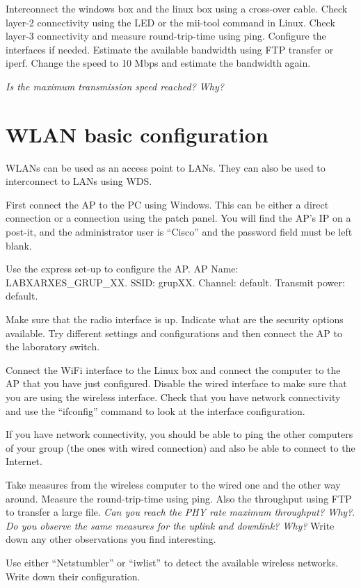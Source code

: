 Interconnect the windows box and the linux box using a cross-over cable.
Check layer-2 connectivity using the LED or the mii-tool command in Linux.
Check layer-3 connectivity and measure round-trip-time using ping. 
Configure the interfaces if needed.
Estimate the available bandwidth using FTP transfer or iperf.
Change the speed to 10 Mbps and estimate the bandwidth again.


\emph{Is the maximum transmission speed reached? Why?}

\section{WLAN basic configuration}

WLANs can be used as an access point to LANs.
They can also be used to interconnect to LANs using WDS.

First connect the AP to the PC using Windows.
This can be either a direct connection or a connection using the patch panel.
You will find the AP's IP on a post-it, and the administrator user is ``Cisco'' and the password field must be left blank.

Use the express set-up to configure the AP.
AP Name: LABXARXES\_GRUP\_XX.
SSID: grupXX.
Channel: default.
Transmit power: default.

Make sure that the radio interface is up. 
Indicate what are the security options available.
Try different settings and configurations and then connect the AP to the laboratory switch.

Connect the WiFi interface to the Linux box and connect the computer to the AP that you have just configured.
Disable the wired interface to make sure that you are using the wireless interface.
Check that you have network connectivity and use the ``ifconfig'' command to look at the interface configuration.

If you have network connectivity, you should be able to ping the other computers of your group (the ones with wired connection) and also be able to connect to the Internet.

Take measures from the wireless computer to the wired one and the other way around.
Measure the round-trip-time using ping.
Also the throughput using FTP to transfer a large file.
\emph{Can you reach the PHY rate maximum throughput? Why?}.
\emph{Do you observe the same measures for the uplink and downlink? Why?}
Write down any other observations you find interesting.

Use either ``Netstumbler'' or ``iwlist'' to detect the available wireless networks.
Write down their configuration.

